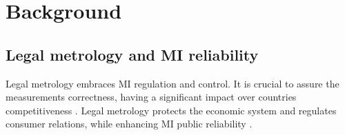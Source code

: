 \documentclass[conference]{IEEEtran}
\begin{document}


\section{Background}
\subsection{Legal metrology and MI reliability}
\label{s:mi_realiability}
Legal metrology embraces MI regulation and control. It is crucial to assure the measurements correctness, having a significant impact over countries competitiveness \cite{RodriguesFilho2015}. Legal metrology protects the economic system and regulates consumer relations, while enhancing MI public reliability \cite{Oppermann2016}.
\end{document}
